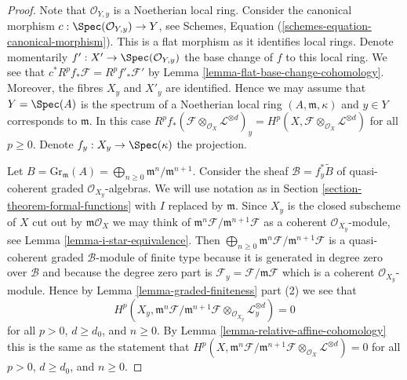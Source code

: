 \begin{proof}
Note that $\mathcal{O}_{Y, y}$ is a Noetherian local ring.
Consider the canonical morphism
$c : \Spec(\mathcal{O}_{Y, y}) \to Y$, see
Schemes, Equation (\ref{schemes-equation-canonical-morphism}).
This is a flat morphism as it identifies local rings.
Denote momentarily $f' : X' \to \Spec(\mathcal{O}_{Y, y})$
the base change of $f$ to this local ring. We see that
$c^*R^pf_*\mathcal{F} = R^pf'_*\mathcal{F}'$ by
Lemma \ref{lemma-flat-base-change-cohomology}.
Moreover, the fibres $X_y$ and $X'_y$ are identified.
Hence we may assume that $Y = \Spec(A)$ is the spectrum of
a Noetherian local ring $(A, \mathfrak m, \kappa)$ and $y \in Y$
corresponds to $\mathfrak m$. In this case
$R^pf_*(\mathcal{F} \otimes_{\mathcal{O}_X} \mathcal{L}^{\otimes d})_y =
H^p(X, \mathcal{F} \otimes_{\mathcal{O}_X} \mathcal{L}^{\otimes d})$
for all $p \geq 0$. Denote $f_y : X_y \to \Spec(\kappa)$ the projection.

\medskip\noindent
Let $B = \text{Gr}_\mathfrak m(A) =
\bigoplus_{n \geq 0} \mathfrak m^n/\mathfrak m^{n + 1}$.
Consider the sheaf $\mathcal{B} = f_y^*\widetilde{B}$
of quasi-coherent graded $\mathcal{O}_{X_y}$-algebras.
We will use notation as in Section \ref{section-theorem-formal-functions}
with $I$ replaced by $\mathfrak m$.
Since $X_y$ is the closed subscheme of $X$ cut out by
$\mathfrak m\mathcal{O}_X$ we may think of
$\mathfrak m^n\mathcal{F}/\mathfrak m^{n + 1}\mathcal{F}$
as a coherent $\mathcal{O}_{X_y}$-module, see
Lemma \ref{lemma-i-star-equivalence}. Then
$\bigoplus_{n \geq 0} \mathfrak m^n\mathcal{F}/\mathfrak m^{n + 1}\mathcal{F}$
is a quasi-coherent graded $\mathcal{B}$-module of finite type
because it is generated in degree zero over $\mathcal{B}$
and because the degree zero part is
$\mathcal{F}_y = \mathcal{F}/\mathfrak m \mathcal{F}$
which is a coherent $\mathcal{O}_{X_y}$-module.
Hence by Lemma \ref{lemma-graded-finiteness} part (2)
we see that
$$
H^p(X_y, \mathfrak m^n \mathcal{F}/ \mathfrak m^{n + 1}\mathcal{F}
\otimes_{\mathcal{O}_{X_y}} \mathcal{L}_y^{\otimes d}) = 0
$$
for all $p > 0$, $d \geq d_0$, and $n \geq 0$. By
Lemma \ref{lemma-relative-affine-cohomology}
this is the same as the statement that
$
H^p(X, \mathfrak m^n \mathcal{F}/ \mathfrak m^{n + 1}\mathcal{F}
\otimes_{\mathcal{O}_X} \mathcal{L}^{\otimes d}) = 0
$
for all $p > 0$, $d \geq d_0$, and $n \geq 0$.


\end{proof}
